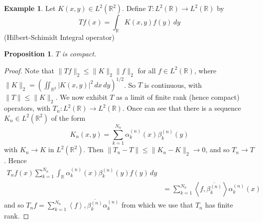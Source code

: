 \documentclass[10pt, oneside, reqno]{amsbook}
\theoremstyle{plain}%
\newtheorem{prop}[thm]{Proposition}
\theoremstyle{definition}
\newtheorem{exmp}[thm]{Example}
\theoremstyle{remark}
\newcommand{\R}{\mathbb{R}}
\newcommand{\iprod}[1]{\left\langle #1 \right\rangle}
\begin{document}
\begin{exmp}
    Let $K(x, y) \in L^2(\R^2)$.  Define $T : L^2(\R) \rightarrow  L^2(\R)$ by \[
        Tf(x) = \int_\R K(x, y) f(y) \, dy
    \] (Hilbert-Schimidt Integral operator)
\end{exmp}
\begin{prop}
    $T$ is compact.  
\end{prop}
\begin{proof}
    Note that $\| Tf \|_2 \leq \| K \|_2 \| f \|_2$ for all $f \in L^2(\R)$, where $\| K \|_2 = \left( \iint_{\R^2} |K(x, y)|^2 \, dx \, dy \right)^{1/2}$.  So $T$ is continuous, with $\| T \| \leq \| K \|_2$.  We now exhibit $T$ as a limit of finite rank (hence compact) operators, with $T_n : L^2(\R) \rightarrow L^2(\R)$.  Once can see that there is a sequence $K_n \in L^2(\R^2)$ of the form \[
        K_n(x, y) = \sum_{k=1}^{N_n} \alpha_k^{(n)}(x) \beta_{k}^{(n)}(y)
    \] with $K_n \rightarrow K$ in $L^2(\R^2)$.  Then $\| T_n - T \| \leq \| K_n - K \|_2 \rightarrow 0$, and so $T_n \rightarrow T$.  Hence 
    \begin{align*}
        T_n f(x) \sum_{k=1}^{N_n} \int_\R \alpha_k^{(n)}(x) \beta_k^{(n)}(y) f(y) \, dy \\
        &= \sum_{k=1}^{N_n} \iprod{f, \overline{\beta_k^{(n)}}} \alpha_k^{(n)} (x) 
    \end{align*}  and so $T_nf = \sum_{k=1}^{N_n} \iprod f, \overline{\beta_k^{(n)}} \alpha_k^{(n)}$ from which we use that $T_n$ has finite rank.  
\end{proof}




\end{document}
